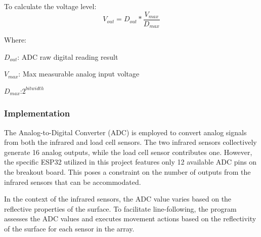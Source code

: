 \documentclass[../report.tex]{subfiles}
\begin{document}
    To calculate the voltage level:
    \begin{equation}
        V_{out}=D_{out}*\dfrac{V_{max}}{D_{max}}
    \end{equation}
    
    Where:

    $D_{out}$: ADC raw digital reading result

    $V_{max}$: Max measurable analog input voltage 

    $D_{max}$:$2^{bitwidth}$

    \subsubsection{Implementation}
The Analog-to-Digital Converter (ADC) is employed to convert analog signals
from both the infrared and load cell sensors. The two infrared sensors
collectively generate 16 analog outputs, while the load cell sensor contributes
one. However, the specific ESP32 utilized in this project features only 12
available ADC pins on the breakout board. This poses a constraint on the number
of outputs from the infrared sensors that can be accommodated.

In the context of the infrared sensors, the ADC value varies based on the
reflective properties of the surface. To facilitate line-following, the program
assesses the ADC values and executes movement actions based on the reflectivity
of the surface for each sensor in the array.
\end{document}

